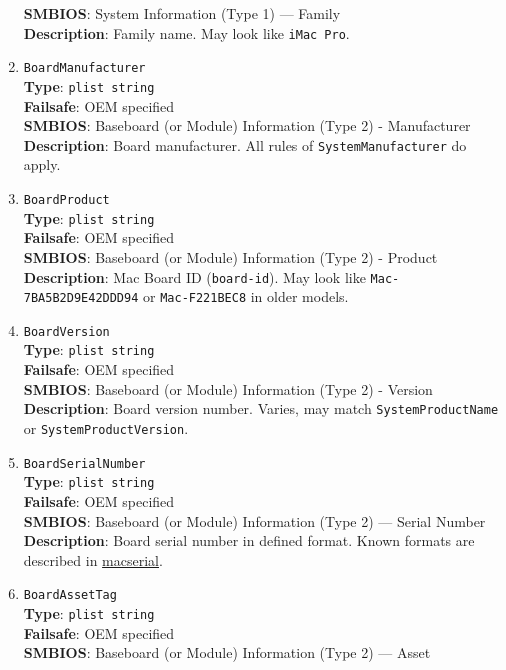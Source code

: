 \documentclass[]{article}
\begin{document}
\begin{enumerate}
  \textbf{SMBIOS}: System Information (Type 1) --- Family\\
  \textbf{Description}: Family name. May look like \texttt{iMac\ Pro}.
\item
  \texttt{BoardManufacturer}\\
  \textbf{Type}: \texttt{plist\ string}\\
  \textbf{Failsafe}: OEM specified\\
  \textbf{SMBIOS}: Baseboard (or Module) Information (Type 2) -
  Manufacturer\\
  \textbf{Description}: Board manufacturer. All rules of
  \texttt{SystemManufacturer} do apply.
\item
  \texttt{BoardProduct}\\
  \textbf{Type}: \texttt{plist\ string}\\
  \textbf{Failsafe}: OEM specified\\
  \textbf{SMBIOS}: Baseboard (or Module) Information (Type 2) -
  Product\\
  \textbf{Description}: Mac Board ID (\texttt{board-id}). May look like
  \texttt{Mac-7BA5B2D9E42DDD94} or \texttt{Mac-F221BEC8} in older
  models.
\item
  \texttt{BoardVersion}\\
  \textbf{Type}: \texttt{plist\ string}\\
  \textbf{Failsafe}: OEM specified\\
  \textbf{SMBIOS}: Baseboard (or Module) Information (Type 2) -
  Version\\
  \textbf{Description}: Board version number. Varies, may match
  \texttt{SystemProductName} or \texttt{SystemProductVersion}.
\item
  \texttt{BoardSerialNumber}\\
  \textbf{Type}: \texttt{plist\ string}\\
  \textbf{Failsafe}: OEM specified\\
  \textbf{SMBIOS}: Baseboard (or Module) Information (Type 2) --- Serial
  Number\\
  \textbf{Description}: Board serial number in defined format. Known
  formats are described in
  \href{https://github.com/acidanthera/macserial/blob/master/FORMAT.md}{macserial}.
\item
  \texttt{BoardAssetTag}\\
  \textbf{Type}: \texttt{plist\ string}\\
  \textbf{Failsafe}: OEM specified\\
  \textbf{SMBIOS}: Baseboard (or Module) Information (Type 2) --- Asset

\end{enumerate}
\end{document}
